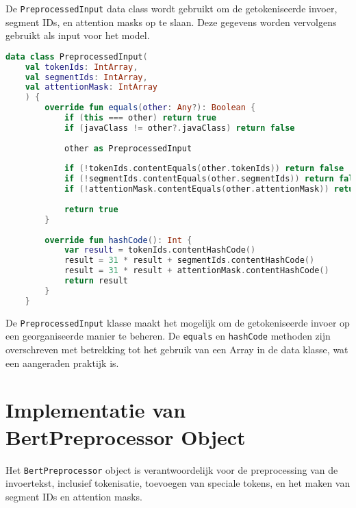 De \texttt{PreprocessedInput} data class wordt gebruikt om de getokeniseerde invoer, segment IDs, en attention masks op te slaan. Deze gegevens worden vervolgens gebruikt als input voor het model.

\begin{lstlisting}[language=Kotlin, caption={Implementatie van PreprocessedInput klasse}]
    data class PreprocessedInput(
    val tokenIds: IntArray,
    val segmentIds: IntArray,
    val attentionMask: IntArray
    ) {
        override fun equals(other: Any?): Boolean {
            if (this === other) return true
            if (javaClass != other?.javaClass) return false
            
            other as PreprocessedInput
            
            if (!tokenIds.contentEquals(other.tokenIds)) return false
            if (!segmentIds.contentEquals(other.segmentIds)) return false
            if (!attentionMask.contentEquals(other.attentionMask)) return false
            
            return true
        }
        
        override fun hashCode(): Int {
            var result = tokenIds.contentHashCode()
            result = 31 * result + segmentIds.contentHashCode()
            result = 31 * result + attentionMask.contentHashCode()
            return result
        }
    }
\end{lstlisting}

De \texttt{PreprocessedInput} klasse maakt het mogelijk om de getokeniseerde invoer op een georganiseerde manier te beheren. De \texttt{equals} en \texttt{hashCode} methoden zijn overschreven met betrekking tot het gebruik van een Array in de data klasse, wat een aangeraden praktijk is.

\section{Implementatie van BertPreprocessor Object}

Het \texttt{BertPreprocessor} object is verantwoordelijk voor de preprocessing van de invoertekst, inclusief tokenisatie, toevoegen van speciale tokens, en het maken van segment IDs en attention masks.

